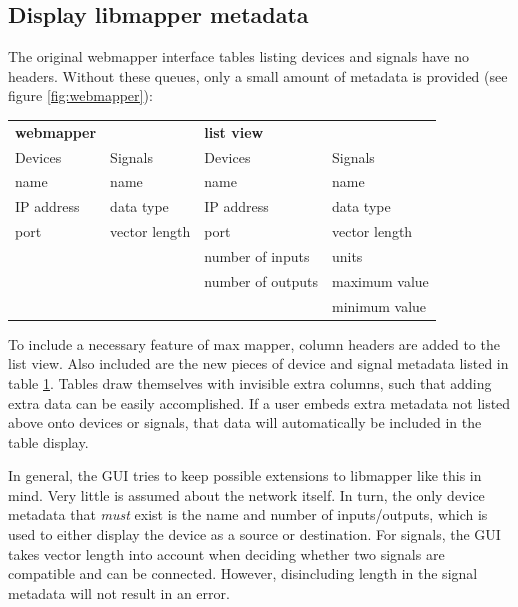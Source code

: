 	
	\subsection{Display libmapper metadata} %
	\label{sub:display_libmapper_metadata}

The original webmapper interface tables listing devices and signals have no headers. Without these queues, only a small amount of metadata is provided (see figure \ref{fig:webmapper}):

\begin{table}
	\centering
	\label{tab:webmapper_list_view_metadata}
		\begin{tabular}{l  l  |  l l }
		\hline\hline
		\textbf{webmapper}&&\textbf{list view}\\
		Devices&Signals&Devices&Signals\\
		\hline
		name&name&name&name\\
		IP address&data type&IP address&data type\\
		port&vector length&port&vector length\\
		&&number of inputs&units\\
		&&number of outputs&maximum value\\
		&&&minimum value\\
		\end{tabular}
\end{table}

To include a necessary feature of max mapper, column headers are added to the list view. Also included are the new pieces of device and signal metadata listed in table \ref{tab:webmapper_list_view_metadata}. Tables draw themselves with invisible extra columns, such that adding extra data can be easily accomplished. If a user embeds extra metadata not listed above onto devices or signals, that data will automatically be included in the table display.  

In general, the GUI tries to keep possible extensions to libmapper like this in mind. Very little is assumed about the network itself. In turn, the only device metadata that \emph{must} exist is the name and number of inputs/outputs, which is used to either display the device as a source or destination. For signals, the GUI takes vector length into account when deciding whether two signals are compatible and can be connected. However, disincluding length in the signal metadata will not result in an error.
	
